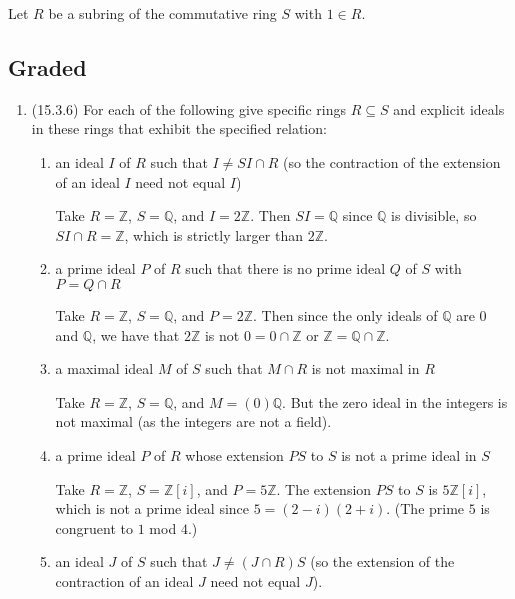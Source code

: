 \documentclass[11pt]{article}
\begin{document}
Let $R$ be a subring of the commutative ring $S$ with $1\in R$.
\subsection*{Graded}
\begin{enumerate}
    \item (15.3.6) For each of the following give specific rings $R\subseteq S$ and explicit ideals in these rings that exhibit the specified relation:\begin{enumerate}
        \item an ideal $I$ of $R$ such that $I\neq SI\cap R$ (so the contraction of the extension of an ideal $I$ need not equal $I$)
        
        Take $R = \mathbb{Z}$, $S = \mathbb{Q}$, and $I = 2\mathbb{Z}$. Then $SI = \mathbb{Q}$ since $\mathbb{Q}$ is divisible, so $SI\cap R = \mathbb{Z}$, which is strictly larger than $2\mathbb{Z}$. 
        \item a prime ideal $P$ of $R$ such that there is no prime ideal $Q$ of $S$ with $P = Q\cap R$
        
        Take $R = \mathbb{Z}$, $S = \mathbb{Q}$, and $P = 2\mathbb{Z}$. Then since the only ideals of $\mathbb{Q}$ are $0$ and $\mathbb{Q}$, we have that $2\mathbb{Z}$ is not $0 = 0\cap\mathbb{Z}$ or $\mathbb{Z} = \mathbb{Q}\cap\mathbb{Z}$. 
        \item a maximal ideal $M$ of $S$ such that $M\cap R$ is not maximal in $R$
        
        Take $R = \mathbb{Z}$, $S = \mathbb{Q}$, and $M = (0)\mathbb{Q}$. But the zero ideal in the integers is not maximal (as the integers are not a field).
        \item a prime ideal $P$ of $R$ whose extension $PS$ to $S$ is not a prime ideal in $S$
        
        Take $R = \mathbb{Z}$, $S = \mathbb{Z}[i]$, and $P = 5\mathbb{Z}$. The extension $PS$ to $S$ is $5\mathbb{Z}[i]$, which is not a prime ideal since $5 = (2-i)(2+i)$. (The prime $5$ is congruent to $1$ mod $4$.)
        \item an ideal $J$ of $S$ such that $J\neq (J\cap R)S$ (so the extension of the contraction of an ideal $J$ need not equal $J$).
        

\end{enumerate}
\end{enumerate}
\end{document}
